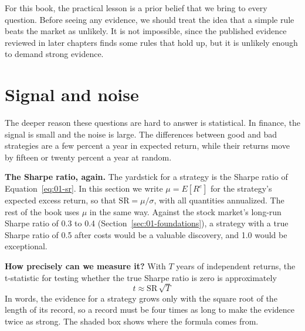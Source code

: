 For this book, the practical lesson is a prior belief that we bring to every question. Before seeing any evidence, we should treat the idea that a simple rule beats the market as unlikely. It is not impossible, since the published evidence reviewed in later chapters finds some rules that hold up, but it is unlikely enough to demand strong evidence.

\section{Signal and noise}
\label{sec:01-signal-noise}

The deeper reason these questions are hard to answer is statistical. In finance, the signal is small and the noise is large. The differences between good and bad strategies are a few percent a year in expected return, while their returns move by fifteen or twenty percent a year at random.

\textbf{The Sharpe ratio, again.} The yardstick for a strategy is the Sharpe ratio of Equation~\eqref{eq:01-sr}. In this section we write $\mu = E[R^{e}]$ for the strategy's expected excess return, so that $\mathrm{SR} = \mu/\sigma$, with all quantities annualized. The rest of the book uses $\mu$ in the same way. Against the stock market's long-run Sharpe ratio of 0.3 to 0.4 (Section~\ref{sec:01-foundations}), a strategy with a true Sharpe ratio of 0.5 after costs would be a valuable discovery, and 1.0 would be exceptional.

\textbf{How precisely can we measure it?} With $T$ years of independent returns, the t-statistic for testing whether the true Sharpe ratio is zero is approximately
\begin{equation}
  t \approx \mathrm{SR}\,\sqrt{T}
  \label{eq:01-t}
\end{equation}
In words, the evidence for a strategy grows only with the square root of the length of its record, so a record must be four times as long to make the evidence twice as strong. The shaded box shows where the formula comes from.

